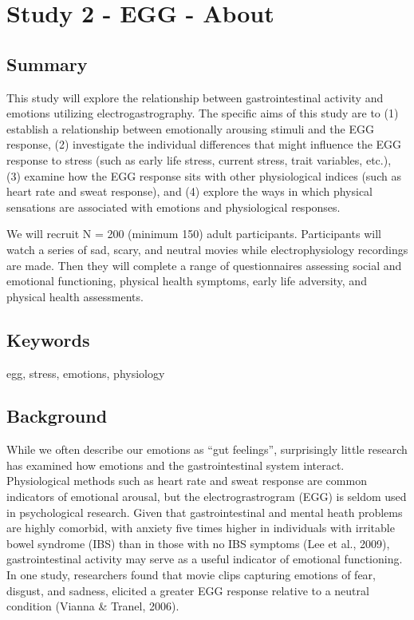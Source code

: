 \documentclass[]{book}
\begin{document}
\hypertarget{study-2---egg---about}{%
\chapter{Study 2 - EGG - About}\label{study-2---egg---about}}

\hypertarget{summary-1}{%
\section{Summary}\label{summary-1}}

This study will explore the relationship between gastrointestinal activity and emotions utilizing electrogastrography. The specific aims of this study are to (1) establish a relationship between emotionally arousing stimuli and the EGG response, (2) investigate the individual differences that might influence the EGG response to stress (such as early life stress, current stress, trait variables, etc.), (3) examine how the EGG response sits with other physiological indices (such as heart rate and sweat response), and (4) explore the ways in which physical sensations are associated with emotions and physiological responses.

We will recruit N = 200 (minimum 150) adult participants. Participants will watch a series of sad, scary, and neutral movies while electrophysiology recordings are made. Then they will complete a range of questionnaires assessing social and emotional functioning, physical health symptoms, early life adversity, and physical health assessments.

\hypertarget{keywords-1}{%
\section{Keywords}\label{keywords-1}}

egg, stress, emotions, physiology

\hypertarget{background-1}{%
\section{Background}\label{background-1}}

While we often describe our emotions as ``gut feelings'', surprisingly little research has examined how emotions and the gastrointestinal system interact. Physiological methods such as heart rate and sweat response are common indicators of emotional arousal, but the electrograstrogram (EGG) is seldom used in psychological research. Given that gastrointestinal and mental heath problems are highly comorbid, with anxiety five times higher in individuals with irritable bowel syndrome (IBS) than in those with no IBS symptoms (Lee et al., 2009), gastrointestinal activity may serve as a useful indicator of emotional functioning. In one study, researchers found that movie clips capturing emotions of fear, disgust, and sadness, elicited a greater EGG response relative to a neutral condition (Vianna \& Tranel, 2006).
\end{document}
